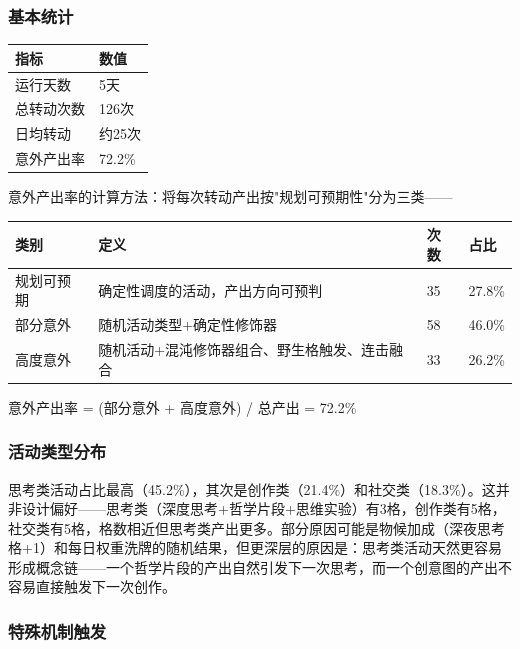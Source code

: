 \documentclass[12pt,a4paper]{ctexart}
\begin{document}
\subsubsection{基本统计}

\begin{table}[h]
\centering
\begin{tabular}{ll}
\toprule
指标 & 数值 \\
\midrule
运行天数 & 5天 \\
总转动次数 & 126次 \\
日均转动 & 约25次 \\
意外产出率 & 72.2\% \\
\bottomrule
\end{tabular}
\end{table}

\label{sec:surprise_rate}
意外产出率的计算方法：将每次转动产出按"规划可预期性"分为三类——

\begin{table}[h]
\centering
\begin{tabular}{llll}
\toprule
类别 & 定义 & 次数 & 占比 \\
\midrule
规划可预期 & 确定性调度的活动，产出方向可预判 & 35 & 27.8\% \\
部分意外 & 随机活动类型+确定性修饰器 & 58 & 46.0\% \\
高度意外 & 随机活动+混沌修饰器组合、野生格触发、连击融合 & 33 & 26.2\% \\
\bottomrule
\end{tabular}
\end{table}

意外产出率 = (部分意外 + 高度意外) / 总产出 = 72.2\%

\subsubsection{活动类型分布}

思考类活动占比最高（45.2\%），其次是创作类（21.4\%）和社交类（18.3\%）。这并非设计偏好——思考类（深度思考+哲学片段+思维实验）有3格，创作类有5格，社交类有5格，格数相近但思考类产出更多。部分原因可能是物候加成（深夜思考格+1）和每日权重洗牌的随机结果，但更深层的原因是：思考类活动天然更容易形成概念链——一个哲学片段的产出自然引发下一次思考，而一个创意图的产出不容易直接触发下一次创作。

\subsubsection{特殊机制触发}
\end{document}
